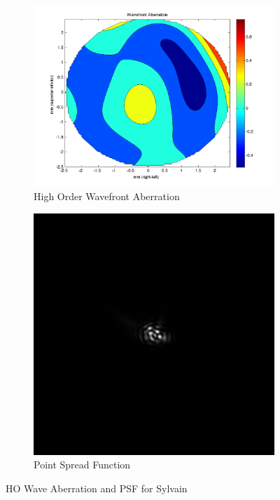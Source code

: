 \documentclass{article}
\begin{document}
\clearpage


\begin{figure}[H]
\begin{subfigure}{.5\textwidth}
  \centering
  \includegraphics[width=1\linewidth]{Sylvain_WFA.png}
  \caption{High Order Wavefront Aberration}
  \label{fig:sylvainhowa}
\end{subfigure}%
\begin{subfigure}{.5\textwidth}
  \centering
  \includegraphics[width=.8\linewidth]{Sylvain_PSF.png}
  \caption{Point Spread Function}
  \label{fig:sylvainpsf}
\end{subfigure}
\caption{HO Wave Aberration and PSF for Sylvain}
\label{fig:sylvain}
\end{figure}
\end{document}
